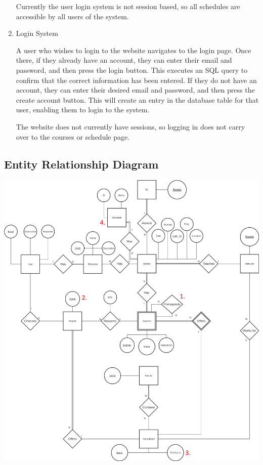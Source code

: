 \documentclass[twoside=false,a4paper,11pt]{article}
\theoremstyle{mytheor}
\begin{document}
\begin{enumerate}
	Currently the user login system is not session based, so all schedules are accessible by all users of the system.

	\item Login System

	A user who wishes to login to the website navigates to the login page. Once there, if they already have an account, they can enter their email and password, and then press the login button. This executes an SQL query to confirm that the correct information has been entered. If they do not have an account, they can enter their desired email and password, and then press the create account button. This will create an entry in the database table for that user, enabling them to login to the system.

	The website does not currently have sessions, so logging in does not carry over to the courses or schedule page. 

\end{enumerate}

\subsection*{Entity Relationship Diagram}

\includegraphics[width=\textwidth]{ERDiagram.png}
\end{document}
